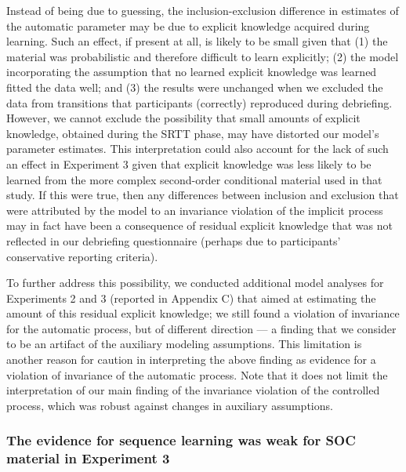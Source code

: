 \documentclass[man]{apa6}
\theoremstyle{definition}
\theoremstyle{definition}
\theoremstyle{definition}
\theoremstyle{remark}
\begin{document}
Instead of being due to guessing, the inclusion-exclusion difference in
estimates of the automatic parameter may be due to explicit knowledge
acquired during learning. Such an effect, if present at all, is likely
to be small given that (1) the material was probabilistic and therefore
difficult to learn explicitly; (2) the model incorporating the
assumption that no learned explicit knowledge was learned fitted the
data well; and (3) the results were unchanged when we excluded the data
from transitions that participants (correctly) reproduced during
debriefing. However, we cannot exclude the possibility that small
amounts of explicit knowledge, obtained during the SRTT phase, may have
distorted our model's parameter estimates. This interpretation could
also account for the lack of such an effect in Experiment 3 given that
explicit knowledge was less likely to be learned from the more complex
second-order conditional material used in that study. If this were true,
then any differences between inclusion and exclusion that were
attributed by the model to an invariance violation of the implicit
process may in fact have been a consequence of residual explicit
knowledge that was not reflected in our debriefing questionnaire
(perhaps due to participants' conservative reporting criteria).

To further address this possibility, we conducted additional model
analyses for Experiments 2 and 3 (reported in Appendix C) that aimed at
estimating the amount of this residual explicit knowledge; we still
found a violation of invariance for the automatic process, but of
different direction --- a finding that we consider to be an artifact of
the auxiliary modeling assumptions. This limitation is another reason
for caution in interpreting the above finding as evidence for a
violation of invariance of the automatic process. Note that it does not
limit the interpretation of our main finding of the invariance violation
of the controlled process, which was robust against changes in auxiliary
assumptions.

\subsubsection{The evidence for sequence learning was weak for SOC
material in Experiment
3}\label{the-evidence-for-sequence-learning-was-weak-for-soc-material-in-experiment-3}
\end{document}
